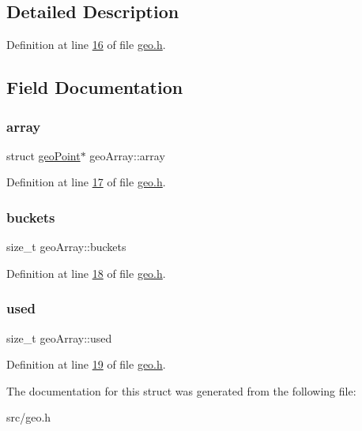 \subsection{Detailed Description}


Definition at line \hyperlink{geo_8h_source_l00016}{16} of file \hyperlink{geo_8h_source}{geo.\+h}.



\subsection{Field Documentation}
\mbox{\label{structgeoArray_a1cc43cbd466bbd97fd31f446b5820b0d}} 
\subsubsection{\texorpdfstring{array}{array}}
{\footnotesize\ttfamily struct \hyperlink{structgeoPoint}{geo\+Point}$\ast$ geo\+Array\+::array}



Definition at line \hyperlink{geo_8h_source_l00017}{17} of file \hyperlink{geo_8h_source}{geo.\+h}.

\mbox{\label{structgeoArray_a2e70eb3d48466cd1e914c0e04c737425}} 
\subsubsection{\texorpdfstring{buckets}{buckets}}
{\footnotesize\ttfamily size\+\_\+t geo\+Array\+::buckets}



Definition at line \hyperlink{geo_8h_source_l00018}{18} of file \hyperlink{geo_8h_source}{geo.\+h}.

\mbox{\label{structgeoArray_a4fc493a8a1ebc7855a1fee78376ad595}} 
\subsubsection{\texorpdfstring{used}{used}}
{\footnotesize\ttfamily size\+\_\+t geo\+Array\+::used}



Definition at line \hyperlink{geo_8h_source_l00019}{19} of file \hyperlink{geo_8h_source}{geo.\+h}.



The documentation for this struct was generated from the following file\+:\begin{DoxyCompactItemize}
\item 
src/geo.\+h\end{DoxyCompactItemize}
